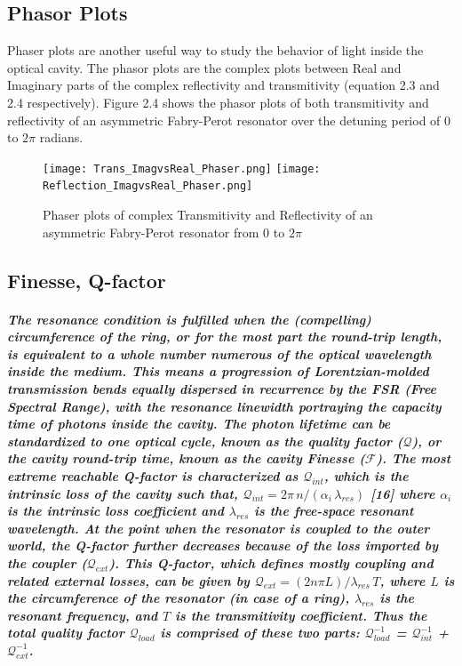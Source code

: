 \subsection{Phasor Plots}
Phaser plots are another useful way to study the behavior of light inside the optical cavity. The phasor plots are the complex plots between Real and Imaginary parts of the complex reflectivity and transmitivity (equation 2.3 and 2.4 respectively). Figure 2.4 shows the phasor plots of both transmitivity and reflectivity of an asymmetric Fabry-Perot resonator over the detuning period of 0 to $2\pi$ radians. 

\begin{figure}[h]
\texttt{[image: Trans\_ImagvsReal\_Phaser.png]}
\texttt{[image: Reflection\_ImagvsReal\_Phaser.png]}
\caption{Phaser plots of complex Transmitivity and Reflectivity of an asymmetric Fabry-Perot resonator from 0 to $2\pi$}
\end{figure}

\subsection{Finesse, Q-factor}
\subparagraph{\normalfont \large The resonance condition is fulfilled when the (compelling) circumference of the ring, or for the most part the round-trip length, is equivalent to a whole number numerous of the optical wavelength inside the medium. This means a progression of Lorentzian-molded transmission bends equally dispersed in recurrence by the FSR (Free Spectral Range), with the resonance linewidth portraying the capacity time of photons inside the cavity. The photon lifetime can be standardized to one optical cycle, known as the quality factor (${\mathcal Q}$), or the cavity round-trip time, known as the cavity Finesse (${\mathcal F}$). The most extreme reachable Q-factor is characterized as ${\mathcal Q_{int}}$, which is the intrinsic loss of the cavity such that, ${\mathcal Q_{int}} = 2\pi\,n/(\alpha_{i}\,\lambda_{res})$ [16] where $\alpha_{i}$ is the intrinsic loss coefficient and $\lambda_{res}$ is the free-space resonant wavelength.  At the point when the resonator is coupled to the outer world, the Q-factor further decreases because of the loss imported by the coupler (${\mathcal Q_{ext}}$). This Q-factor, which defines mostly coupling and related external losses, can be given by ${\mathcal Q_{ext}} = (2n \pi L)/ {\lambda_{res}\, T}$, where $L$ is the circumference of the resonator (in case of a ring), $\lambda_{res}$ is the resonant frequency, and $T$ is the transmitivity coefficient. Thus the total quality factor ${\mathcal Q_{load}}$ is comprised of these two parts: ${\mathcal Q_{load}^{-1}}$ = ${\mathcal Q_{int}^{-1}}$ + ${\mathcal Q_{ext}^{-1}}$.}

